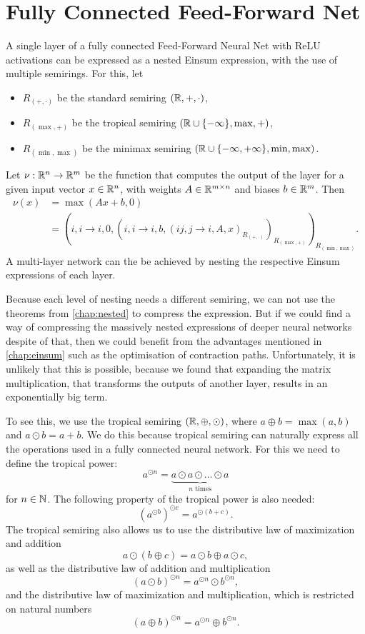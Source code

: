 \section{Fully Connected Feed-Forward Net}
A single layer of a fully connected Feed-Forward Neural Net with ReLU activations can be expressed as a nested Einsum expression, with the use of multiple semirings.
For this, let
\begin{itemize}
    \item $R_{(+, \cdot)}$ be the standard semiring $(\mathbb{R}, +, \cdot)$,
    \item $R_{(\max, +)}$ be the tropical semiring $(\mathbb{R} \cup \lbrace -\infty \rbrace, \max, +)$,
    \item $R_{(\min, \max)}$ be the minimax semiring $(\mathbb{R} \cup \lbrace -\infty, +\infty \rbrace, \min, \max)$.
\end{itemize}
Let $\nu: \mathbb{R}^n \rightarrow \mathbb{R}^m$ be the function that computes the output of the layer for a given input vector $x \in \mathbb{R}^n$, with weights $A \in \mathbb{R}^{m \times n}$ and biases $b \in \mathbb{R}^m$.
Then
\begin{align*}
    \nu(x) & = \max(Ax + b, 0)                                                                                                                   \\
           & = (i,i\rightarrow i, 0, (i,i \rightarrow i, b, (ij, j \rightarrow i, A, x)_{R_{(+, \cdot)}} )_{R_{(\max, +)}} )_{R_{(\min, \max)}}.
\end{align*}
A multi-layer network can the be achieved by nesting the respective Einsum expressions of each layer.

Because each level of nesting needs a different semiring, we can not use the theorems from \cref{chap:nested} to compress the expression.
But if we could find a way of compressing the massively nested expressions of deeper neural networks despite of that, then we could benefit from the advantages mentioned in \cref{chap:einsum} such as the optimisation of contraction paths.
Unfortunately, it is unlikely that this is possible, because we found that expanding the matrix multiplication, that transforms the outputs of another layer, results in an exponentially big term.

To see this, we use the tropical semiring $(\mathbb{R}, \oplus, \odot)$, where $a \oplus b = \max(a,b)$ and $a \odot b = a + b$.
We do this because tropical semiring can naturally express all the operations used in a fully connected neural network.
For this we need to define the tropical power:
$$a^{\odot n} = \underbrace{a \odot a \odot \ldots \odot a}_{n \text{ times}}$$
for $n \in \mathbb{N}$. The following property of the tropical power is also needed:
$$\left(a^{\odot b}\right)^{\odot c} = a^{\odot(b + c)}.$$
The tropical semiring also allows us to use the distributive law of maximization and addition
$$a \odot (b \oplus c) = a \odot b \oplus a \odot c,$$
as well as the distributive law of addition and multiplication
$$(a \odot b)^{\odot n} = a^{\odot n} \odot b^{\odot n},$$
and the distributive law of maximization and multiplication, which is restricted on natural numbers
$$(a \oplus b)^{\odot n} = a^{\odot n} \oplus b^{\odot n}.$$

